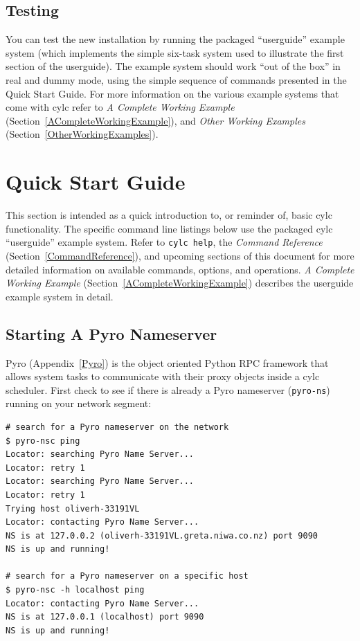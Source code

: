 \documentclass[11pt,a4paper]{article}
\begin{document}
\subsection{Testing} 
\label{Testing}

You can test the new installation by running the packaged ``userguide''
example system (which implements the simple six-task system used to 
illustrate the first section of the userguide). The example system
should work ``out of the box'' in real and dummy mode, using the simple
sequence of commands presented in the Quick Start Guide. 
For more information on the various example systems that come with cylc
refer to {\em A Complete Working Example}
(Section~\ref{ACompleteWorkingExample}), and {\em Other Working
Examples} (Section~\ref{OtherWorkingExamples}).  

\pagebreak
\section{Quick Start Guide} 
\label{QuickStartGuide}

\lstset{language=bash}

This section is intended as a quick introduction to, or reminder of,
basic cylc functionality. The specific command line listings below use
the packaged cylc ``userguide'' example system. Refer to 
\lstinline=cylc help=, the {\em Command Reference}
(Section~\ref{CommandReference}), and
upcoming sections of this document for more detailed information on
available commands, options, and operations.  {\em A Complete Working
Example} (Section~\ref{ACompleteWorkingExample}) describes the
userguide example system in detail.

\subsection{Starting A Pyro Nameserver}
\label{QuickStartingAPyroNameserver}

Pyro (Appendix~\ref{Pyro}) is the object oriented Python RPC framework
that allows system tasks to communicate with their proxy objects inside
a cylc scheduler. First check to see if there is already a Pyro
nameserver (\lstinline=pyro-ns=) running on your network segment:

\begin{lstlisting}
# search for a Pyro nameserver on the network
$ pyro-nsc ping
Locator: searching Pyro Name Server...
Locator: retry 1
Locator: searching Pyro Name Server...
Locator: retry 1
Trying host oliverh-33191VL
Locator: contacting Pyro Name Server...
NS is at 127.0.0.2 (oliverh-33191VL.greta.niwa.co.nz) port 9090
NS is up and running!

# search for a Pyro nameserver on a specific host
$ pyro-nsc -h localhost ping
Locator: contacting Pyro Name Server...
NS is at 127.0.0.1 (localhost) port 9090
NS is up and running!
\end{lstlisting}
\end{document}
